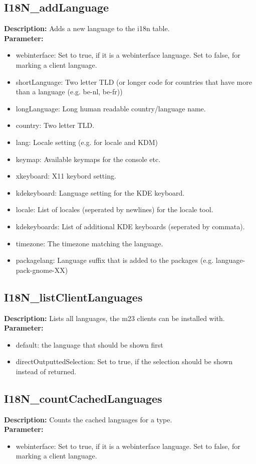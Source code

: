 \subsection{I18N\_addLanguage}
\textbf{Description:} Adds a new language to the i18n table.\\
\textbf{Parameter:}
\begin{itemize}
\item webinterface: Set to true, if it is a webinterface language. Set to false, for marking a client language.
\item shortLanguage: Two letter TLD (or longer code for countries that have more than a language (e.g. be-nl, be-fr))
\item longLanguage: Long human readable country/language name.
\item country: Two letter TLD.
\item lang: Locale setting (e.g. for locale and KDM)
\item keymap: Available keymaps for the console etc.
\item xkeyboard: X11 keybord setting.
\item kdekeyboard: Language setting for the KDE keyboard.
\item locale: List of locales (seperated by newlines) for the locale tool.
\item kdekeyboards: List of additional KDE keyboards (seperated by commata).
\item timezone: The timezone matching the language.
\item packagelang: Language suffix that is added to the packages (e.g. language-pack-gnome-XX)
\end{itemize}

\subsection{I18N\_listClientLanguages}
\textbf{Description:} Lists all languages, the m23 clients can be installed with.\\
\textbf{Parameter:}
\begin{itemize}
\item default: the language that should be shown first
\item directOutputtedSelection: Set to true, if the selection should be shown instead of returned.
\end{itemize}

\subsection{I18N\_countCachedLanguages}
\textbf{Description:} Counts the cached languages for a type.\\
\textbf{Parameter:}
\begin{itemize}
\item webinterface: Set to true, if it is a webinterface language. Set to false, for marking a client language.
\end{itemize}

